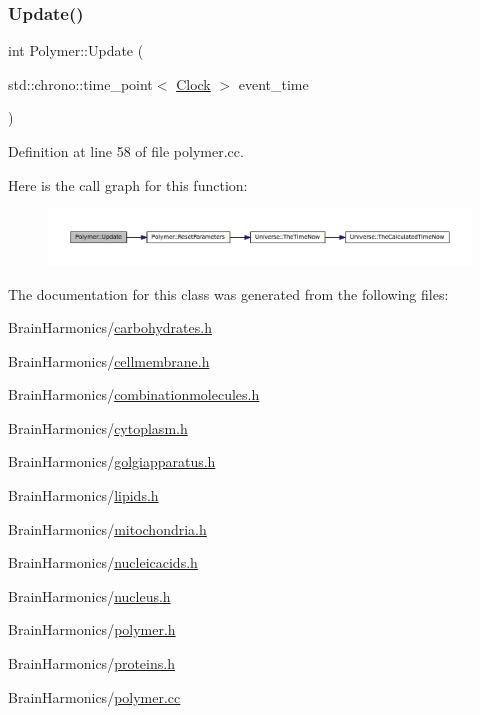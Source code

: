 \mbox{\label{class_polymer_ac82f603c3010212122008c4ed3953045}} 
\subsubsection{\texorpdfstring{Update()}{Update()}}
{\footnotesize\ttfamily int Polymer\+::\+Update (\begin{DoxyParamCaption}\item[{std\+::chrono\+::time\+\_\+point$<$ \mbox{\hyperlink{universe_8h_a0ef8d951d1ca5ab3cfaf7ab4c7a6fd80}{Clock}} $>$}]{event\+\_\+time }\end{DoxyParamCaption})}



Definition at line 58 of file polymer.\+cc.

Here is the call graph for this function\+:\nopagebreak
\begin{figure}[H]
\begin{center}
\leavevmode
\includegraphics[width=350pt]{class_polymer_ac82f603c3010212122008c4ed3953045_cgraph}
\end{center}
\end{figure}


The documentation for this class was generated from the following files\+:\begin{DoxyCompactItemize}
\item 
Brain\+Harmonics/\mbox{\hyperlink{carbohydrates_8h}{carbohydrates.\+h}}\item 
Brain\+Harmonics/\mbox{\hyperlink{cellmembrane_8h}{cellmembrane.\+h}}\item 
Brain\+Harmonics/\mbox{\hyperlink{combinationmolecules_8h}{combinationmolecules.\+h}}\item 
Brain\+Harmonics/\mbox{\hyperlink{cytoplasm_8h}{cytoplasm.\+h}}\item 
Brain\+Harmonics/\mbox{\hyperlink{golgiapparatus_8h}{golgiapparatus.\+h}}\item 
Brain\+Harmonics/\mbox{\hyperlink{lipids_8h}{lipids.\+h}}\item 
Brain\+Harmonics/\mbox{\hyperlink{mitochondria_8h}{mitochondria.\+h}}\item 
Brain\+Harmonics/\mbox{\hyperlink{nucleicacids_8h}{nucleicacids.\+h}}\item 
Brain\+Harmonics/\mbox{\hyperlink{nucleus_8h}{nucleus.\+h}}\item 
Brain\+Harmonics/\mbox{\hyperlink{polymer_8h}{polymer.\+h}}\item 
Brain\+Harmonics/\mbox{\hyperlink{proteins_8h}{proteins.\+h}}\item 
Brain\+Harmonics/\mbox{\hyperlink{polymer_8cc}{polymer.\+cc}}\end{DoxyCompactItemize}
